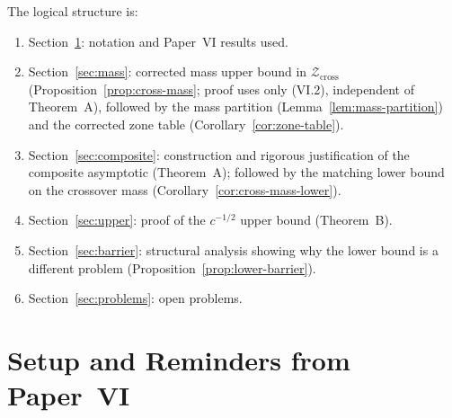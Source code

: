 \documentclass[12pt,a4paper]{amsart}
\theoremstyle{definition}
\theoremstyle{remark}
\newcommand{\Zcross}{\mathcal{Z}_{\mathrm{cross}}}
\begin{document}
The logical structure is:
\begin{enumerate}
\item Section~\ref{sec:setup}: notation and
Paper~VI results used.
\item Section~\ref{sec:mass}: corrected mass
upper bound in $\Zcross$
(Proposition~\ref{prop:cross-mass};
proof uses only (VI.2), independent of Theorem~A),
followed by the mass partition
(Lemma~\ref{lem:mass-partition})
and the corrected zone table
(Corollary~\ref{cor:zone-table}).
\item Section~\ref{sec:composite}: construction
and rigorous justification of the composite
asymptotic (Theorem~A);
followed by the matching lower bound on the
crossover mass (Corollary~\ref{cor:cross-mass-lower}).
\item Section~\ref{sec:upper}: proof of the
$c^{-1/2}$ upper bound (Theorem~B).
\item Section~\ref{sec:barrier}: structural
analysis showing why the lower bound is
a different problem (Proposition~\ref{prop:lower-barrier}).
\item Section~\ref{sec:problems}: open problems.
\end{enumerate}

\tableofcontents

\section{Setup and Reminders from Paper~VI}
\label{sec:setup}
\end{document}
